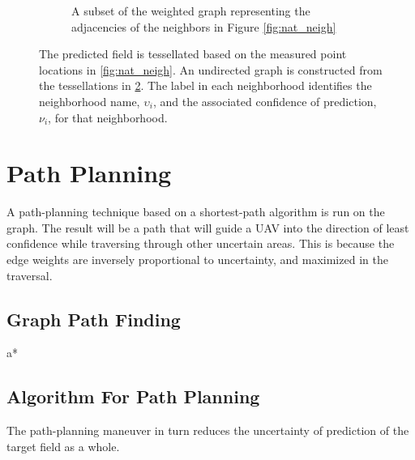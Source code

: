 \documentclass[11pt]{ucthesis}
\begin{document}
\begin{figure}[thpb]
\begin{subfigure}[b]{\textwidth}

        \captionsetup{skip=0.5\baselineskip,size=footnotesize}
        \caption{A subset of the weighted graph representing the adjacencies of the neighbors in Figure \ref{fig:nat_neigh}}
        \label{fig:neigh_graph}
  \end{subfigure}
  \captionsetup{skip=0.5\baselineskip,size=small}
  \caption{The predicted field is tessellated based on the measured point locations in \ref{fig:nat_neigh}. An undirected graph is constructed from the tessellations in \ref{fig:neigh_graph}. The label in each neighborhood identifies the neighborhood name, $\upsilon_i$, and the associated confidence of prediction, $\nu_i$, for that neighborhood.}
\end{figure}

\section{Path Planning}
A path-planning technique based on a shortest-path algorithm is run on the graph. The result will be a path that will guide a UAV into the direction of least confidence while traversing through other uncertain areas. This is because the edge weights are inversely proportional to uncertainty, and maximized in the traversal. 

\subsection{Graph Path Finding}
a*

\subsection{Algorithm For Path Planning}
The path-planning maneuver in turn reduces the uncertainty of prediction of the target field as a whole. 
\end{document}
